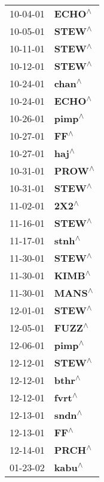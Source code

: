 \begin{supertabular}{p{0.08\textwidth}p{0.2\textwidth}}
 10-04-01 &    \textbf{ECHO\textsuperscript{$\wedge$}} \\
 10-05-01 &    \textbf{STEW\textsuperscript{$\wedge$}} \\
 10-11-01 &    \textbf{STEW\textsuperscript{$\wedge$}} \\
 10-12-01 &    \textbf{STEW\textsuperscript{$\wedge$}} \\
 10-24-01 &    \textbf{chan\textsuperscript{$\wedge$}} \\
 10-24-01 &    \textbf{ECHO\textsuperscript{$\wedge$}} \\
 10-26-01 &    \textbf{pimp\textsuperscript{$\wedge$}} \\
 10-27-01 &      \textbf{FF\textsuperscript{$\wedge$}} \\
 10-27-01 &     \textbf{haj\textsuperscript{$\wedge$}} \\
 10-31-01 &    \textbf{PROW\textsuperscript{$\wedge$}} \\
 10-31-01 &    \textbf{STEW\textsuperscript{$\wedge$}} \\
 11-02-01 &     \textbf{2X2\textsuperscript{$\wedge$}} \\
 11-16-01 &    \textbf{STEW\textsuperscript{$\wedge$}} \\
 11-17-01 &    \textbf{stnh\textsuperscript{$\wedge$}} \\
 11-30-01 &    \textbf{STEW\textsuperscript{$\wedge$}} \\
 11-30-01 &    \textbf{KIMB\textsuperscript{$\wedge$}} \\
 11-30-01 &    \textbf{MANS\textsuperscript{$\wedge$}} \\
 12-01-01 &    \textbf{STEW\textsuperscript{$\wedge$}} \\
 12-05-01 &    \textbf{FUZZ\textsuperscript{$\wedge$}} \\
 12-06-01 &    \textbf{pimp\textsuperscript{$\wedge$}} \\
 12-12-01 &    \textbf{STEW\textsuperscript{$\wedge$}} \\
 12-12-01 &    \textbf{bthr\textsuperscript{$\wedge$}} \\
 12-12-01 &    \textbf{fvrt\textsuperscript{$\wedge$}} \\
 12-13-01 &    \textbf{sndn\textsuperscript{$\wedge$}} \\
 12-13-01 &      \textbf{FF\textsuperscript{$\wedge$}} \\
 12-14-01 &    \textbf{PRCH\textsuperscript{$\wedge$}} \\
 01-23-02 &    \textbf{kabu\textsuperscript{$\wedge$}} \\

\end{supertabular}
